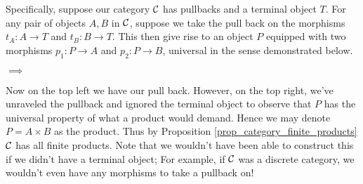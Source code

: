     Specifically, suppose our category $\mathcal{C}$ has pullbacks and a terminal object $T$. 
    For any pair of objects $A, B$ in $\mathcal{C}$, suppose we take the pull back on 
    the morphisms $t_A: A \to T$ and $t_B: B \to T$. This then give 
    rise to an object $P$ equipped with two morphisms $p_1: P \to A$ 
    and $p_2: P \to B$, universal in the sense demonstrated below. 
    \begin{center}
        $\implies$
    \end{center}
    Now on the top left we have our pull back. However, on the top right, we've 
    unraveled the pullback and ignored the terminal object to observe that $P$ 
    has the universal property of what a product would demand. Hence we may denote 
    $P = A \times B$ as the product. Thus by Proposition \ref{prop_category_finite_products} 
    $\mathcal{C}$ has all finite products. \textcolor{NavyBlue}{Note that we wouldn't have been able 
    to construct this if we didn't have a terminal object; For example, if $\mathcal{C}$ 
    was a discrete category, we wouldn't even have any morphisms to take a pullback on!}

